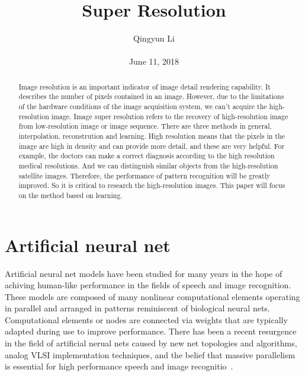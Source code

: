 \documentclass[10pt,twocolumn,letterpaper]{article}
\begin{document}
\author{Qingyun Li\\\\
June 11, 2018}        
\title{Super Resolution}

\maketitle

\begin{abstract}
 \par
  Image resolution is an important indicator of image detail rendering capability. It describes the number of pixels contained in an image. However, due to the limitations of the hardware conditions of the image acquisition system, we can't acquire the high-resolution image. Image super resolution refers to the recovery of high-resolution image from low-resolution image or image sequence. There are three methods in general, interpolation, reconstrution and learning.  High resolution means that the pixels in the image are high in density and can provide more detail, and these are very helpful. For example, the doctors can make a correct diagnosis according to the high resolution medical resolutions. And we can distinguish similar objects from the high-resolution satellite images. Therefore, the performance of pattern recognition will be greatly improved. So it is critical to research the high-resolution images. This paper will focus on the method based on learning.
\end{abstract}
\section{Artificial neural net}
 \par Artificial neural net models have been studied for many years in the hope of achiving human-like performance in the fields of speech and image recognition. These models are composed of many nonlinear computational elements operating in parallel and arranged in patterns reminiscent of biological neural nets. Computational elements or nodes are connected via weights that are typically adapted during use to improve performance. There has been a recent resurgence in the field of artificial nerual nets caused by new net topologies and algorithms, analog VLSI implementation techniques, and the belief that massive parallelism is essential for high performance speech and image recognitio~\cite{lippmann1987introduction}.
\end{document}
